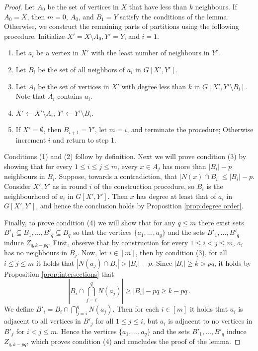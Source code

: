 \documentclass{theoretics}
\begin{document}
\begin{proof}
	Let $A_0$ be the set of vertices in $X$ that have less than $k$ neighbours. If $A_0 = X$, then
	$m=0$, $A_0$, and $B_1 = Y$ satisfy the conditions of the lemma.
	Otherwise, we construct the remaining parts of partitions using the following procedure.
	Initialize $X' = X \setminus A_0, Y'=Y$, and $i=1$.
	\begin{enumerate}
		\item Let $a_i$ be a vertex in $X'$ with the least number of neighbours in $Y'$.
		\item Let $B_i$ be the set of all neighbors of $a_i$ in $G[X',Y']$.
		\item Let $A_i$ be the set of vertices in $X'$ with degree less than $k$ in $G[X',Y'\setminus B_i]$.
		Note that $A_i$ contains $a_i$.
		\item $X' \gets X' \setminus A_i$, $Y' \gets Y' \setminus B_i$.
		\item If $X' = \emptyset$, then $B_{i+1} = Y'$, let $m=i$, and terminate the procedure;
		Otherwise increment $i$ and return to step 1.
	\end{enumerate}
	
	\noindent
	Conditions (1) and (2) follow by definition. Next we will prove condition (3) by showing 
	that for every $1 \leq i \leq j \leq m$, every $x \in A_j$ has more than $|B_i| - p$ neighbours in $B_i$.
	Suppose, towards a contradiction, that $|N(x) \cap B_i| \leq |B_i|-p$. Consider $X',Y'$ as in round $i$ of
	the construction procedure, so $B_i$ is the neighbourhood of $a_i$ in $G[X',Y']$. 
	Then $x$ has degree at least that of $a_i$ in $G[X',Y']$, and hence the conclusion holds by 
	Proposition \ref{prop:degree order}.

	Finally, to prove condition (4) we will show that for any $q \leq m$ there exist sets $B'_1 \subseteq B_1, \dotsc, B'_q \subseteq B_q$ so that the vertices $\{a_1, \dotsc, a_q\}$ and the sets $B'_1, \dotsc, B'_q$ induce $Z_{q,k-pq}$.
	First, observe that by construction for every $1 \leq i < j \leq m$, $a_i$ has no neighbours in $B_j$.
	Now, let $i \in [m]$, then by condition (3), for all $i \leq j \leq m$ it holds that $|N(a_j) \cap B_i| > |B_i|-p$.
	Since $|B_i| \geq k > pq$, it holds by Proposition \ref{prop:intersections} that
	\[
		\left|B_i \cap \bigcap_{j=i}^q N(a_j)\right| \geq |B_i| - pq \geq k-pq \,.
	\]
	We define $B'_i = B_i \cap \bigcap_{j=i}^q N(a_j)$.
	Then for each $i \in[m]$ it holds that $a_i$ is adjacent to all vertices in $B'_j$ for all $1 \leq j \leq i$, but $a_i$ is adjacent to no vertices in $B'_j$ for $i < j \leq m$. Hence the vertices $\{a_1, \dotsc, a_q\}$ and the sets $B'_1, \dotsc, B'_q$ induce $Z_{q,k-pq}$, which proves condition (4) and 
	concludes the proof of the lemma.
\end{proof}
\end{document}
